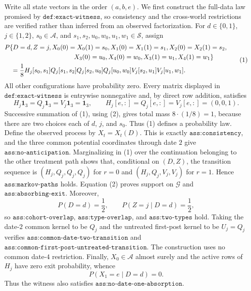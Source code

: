 Write all state vectors in the order \( (a,b,e) \).  We first construct the full-data law promised by \(\texttt{def:exact-witness}\), so consistency and the cross-world restrictions are verified rather than inferred from an observed factorization.  For \(d\in\{0,1\}\), \(j\in\{1,2\}\), \(s_0\in\mathcal A\), and \(s_1,s_2,u_0,w_0,u_1,w_1\in\mathcal S\), assign
\[
\begin{aligned}
&P\{D=d,Z=j,X_0(0)=X_0(1)=s_0,
X_1(0)=X_1(1)=s_1,X_2(0)=X_2(1)=s_2,\\
&\hspace{38mm}X_3(0)=u_0,X_4(0)=w_0,
X_3(1)=u_1,X_4(1)=w_1\}\\
&\quad =\frac18 H_j[s_0,s_1]Q_j[s_1,s_2]
Q_j[s_2,u_0]Q_j[u_0,w_0]
V_j[s_2,u_1]V_j[u_1,w_1].
\end{aligned}                                                    \tag{1}
\]
All other configurations have probability zero.  Every matrix displayed in \(\texttt{def:exact-witness}\) is entrywise nonnegative and, by direct row addition, satisfies
\[
H_j\mathbf 1_3=Q_j\mathbf 1_3=V_j\mathbf 1_3=\mathbf 1_3,
\qquad
H_j[e,{:}]=Q_j[e,{:}]=V_j[e,{:}]=(0,0,1).                    \tag{2}
\]
Successive summation of (1), using (2), gives total mass
\(8\cdot(1/8)=1\), because there are two choices each of \(d\), \(j\), and \(s_0\).  Thus (1) defines a probability law.  Define the observed process by \(X_t=X_t(D)\).  This is exactly \(\texttt{ass:consistency}\), and the three common potential coordinates through date \(2\) give \(\texttt{ass:no-anticipation}\).  Marginalizing in (1) over the continuation belonging to the other treatment path shows that, conditional on \((D,Z)\), the transition sequence is \((H_j,Q_j,Q_j,Q_j)\) for \(r=0\) and \((H_j,Q_j,V_j,V_j)\) for \(r=1\).  Hence \(\texttt{ass:markov-paths}\) holds.  Equation (2) proves support on \(\mathcal G\) and \(\texttt{ass:absorbing-exit}\).  Moreover,
\[
P(D=d)=\frac12,
\qquad
P(Z=j\mid D=d)=\frac12,                                    \tag{3}
\]
so \(\texttt{ass:cohort-overlap}\), \(\texttt{ass:type-overlap}\), and \(\texttt{ass:two-types}\) hold.  Taking the date-\(2\) common kernel to be \(Q_j\) and the untreated first-post kernel to be \(U_j=Q_j\) verifies \(\texttt{ass:common-date-two-transition}\) and \(\texttt{ass:common-first-post-untreated-transition}\).  The construction uses no common date-\(4\) restriction.  Finally, \(X_0\in\mathcal A\) almost surely and the active rows of \(H_j\) have zero exit probability, whence
\[
P(X_1=e\mid D=d)=0.                                         \tag{4}
\]
Thus the witness also satisfies \(\texttt{ass:no-date-one-absorption}\).


